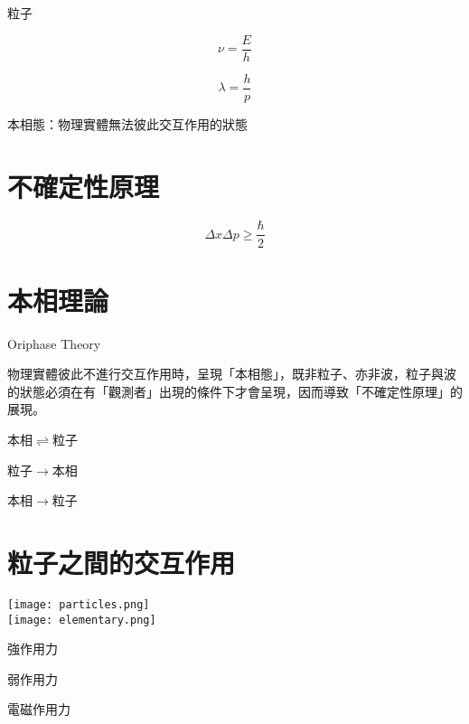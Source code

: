 \documentclass[a4paper,notitlepage,UTF8]{ctexart}
\begin{document}
粒子

\begin{equation}
\nu = \frac{E}{h}
\end{equation}

\begin{equation}
\lambda = \frac{h}{p}
\end{equation}



本相態：物理實體無法彼此交互作用的狀態


\section{不確定性原理}

\begin{equation}
\Delta x \Delta p \geq \frac{\hbar}{2}
\end{equation}

\section{本相理論}

Oriphase Theory

物理實體彼此不進行交互作用時，呈現「本相態」，既非粒子、亦非波，粒子與波的狀態必須在有「觀測者」出現的條件下才會呈現，因而導致「不確定性原理」的展現。


本相$\rightleftharpoons$粒子


粒子$\rightarrow$本相












本相$\rightarrow$粒子






\section{粒子之間的交互作用}

\begin{center}
\texttt{[image: particles.png]}
\\
\texttt{[image: elementary.png]}
\end{center}

強作用力


弱作用力


電磁作用力
\end{document}

